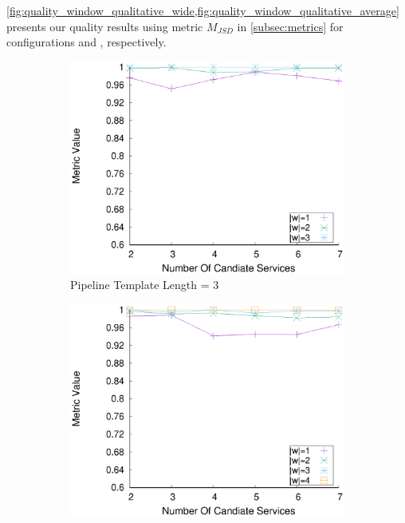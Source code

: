     \cref{fig:quality_window_qualitative_wide,fig:quality_window_qualitative_average} {\color{OurColor2}presents} our quality results using metric $M_{JSD}$ in \cref{subsec:metrics} for configurations \wide and \average, respectively.


    \begin{figure}[ht!]
      \centering
      \begin{subfigure}{0.49\textwidth}
        \includegraphics[width=\textwidth]{Images/graphs/window_quality_performance_diff_qual_n7_s7_20_100_n3}
        \caption{Pipeline Template Length = 3}
        \label{fig:quality_window_wide_qualitative_n3}
      \end{subfigure}
      \hfill
      \begin{subfigure}{0.49\textwidth}
        \includegraphics[width=\textwidth]{Images/graphs/window_quality_performance_diff_qual_n7_s7_20_100_n4}

\end{subfigure}
\end{figure}
